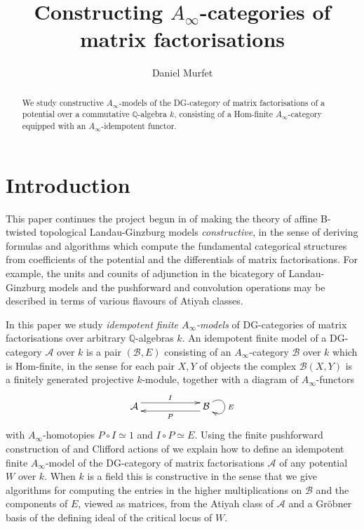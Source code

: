 \documentclass[english,letter paper,12pt,leqno]{article}
\theoremstyle{example}
\numberwithin{equation}{section}
\def\AA{\mathcal{A}}
\def\BB{\mathcal{B}}
\def\res{\operatorname{Res}}
\begin{document}
\def\Res{\res\!}
\newcommand{\ud}{\mathrm{d}}
\newcommand{\Ress}[1]{\res_{#1}\!}
\newcommand{\cat}[1]{\mathcal{#1}}
\newcommand{\lto}{\longrightarrow}
\newcommand{\xlto}[1]{\stackrel{#1}\lto}
\newcommand{\md}[1]{\mathscr{#1}}
\newcommand{\coeff}[1]{\widetilde{#1}}
\def\sus{\l}
\def\l{\,|\,}
\def\sgn{\textup{sgn}}
\def\samp{\zeta}
\def\Samp{Z}
\def\traff{N}

\title{Constructing $A_\infty$-categories of matrix factorisations}
\author{Daniel Murfet}

\maketitle

\begin{abstract}
We study constructive $A_\infty$-models of the DG-category of matrix factorisations of a potential over a commutative $\mathbb{Q}$-algebra $k$, consisting of a Hom-finite $A_\infty$-category equipped with an $A_\infty$-idempotent functor.
\end{abstract}

\tableofcontents

\section{Introduction}

This paper continues the project begun in \cite{pushforward,cut,lgdual} of making the theory of affine B-twisted topological Landau-Ginzburg models \emph{constructive}, in the sense of deriving formulas and algorithms which compute the fundamental categorical structures from coefficients of the potential and the differentials of matrix factorisations. For example, the units and counits of adjunction in the bicategory of Landau-Ginzburg models \cite{lgdual} and the pushforward and convolution operations \cite{pushforward} may be described in terms of various flavours of Atiyah classes.

In this paper we study \emph{idempotent finite $A_\infty$-models} of DG-categories of matrix factorisations over arbitrary $\mathbb{Q}$-algebras $k$. An idempotent finite model of a DG-category $\AA$ over $k$ is a pair $(\mathcal{B}, E)$ consisting of an $A_\infty$-category $\mathcal{B}$ over $k$ which is Hom-finite, in the sense for each pair $X,Y$ of objects the complex $\mathcal{B}(X,Y)$ is a finitely generated projective $k$-module, together with a diagram of $A_\infty$-functors
\[
\xymatrix@C+3pc{
\AA \ar@<1ex>[r]^I & \mathcal{B} \ar@(ur,dr)^E \ar@<1ex>[l]^P
}
\]
with $A_\infty$-homotopies $P \circ I \simeq 1$ and $I \circ P \simeq E$. Using the finite pushforward construction of \cite{pushforward} and Clifford actions of \cite{cut} we explain how to define an idempotent finite $A_\infty$-model of the DG-category of matrix factorisations $\AA$ of any potential $W$ over $k$. When $k$ is a field this is constructive in the sense that we give algorithms for computing the entries in the higher multiplications on $\BB$ and the components of $E$, viewed as matrices, from the Atiyah class of $\AA$ and a Gr\"obner basis of the defining ideal of the critical locus of $W$.
\end{document}
